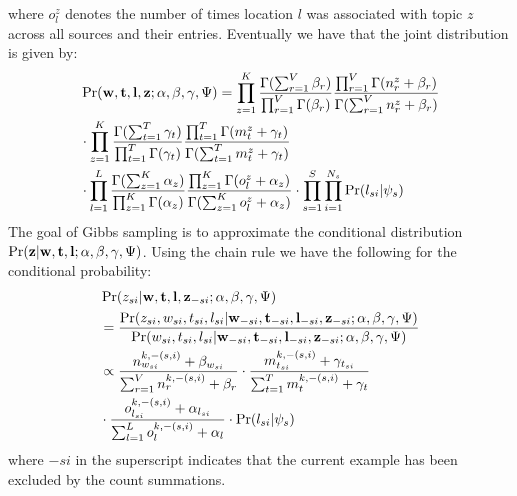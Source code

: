 \documentclass{sig-alternate}
\newcommand{\w}{{\bf w}}
\newcommand{\z}{{\bf z}}
\newcommand{\loc}{{\bf l}}
\newcommand{\tim}{{\bf t}}
\begin{document}
where $o^z_l$ denotes the number of times location $l$ was associated with topic $z$ across all sources and their entries. 
Eventually we have that the joint distribution is given by:
{\scriptsize
\begin{align}
&\Pr(\w,\tim,\loc,\z;\alpha,\beta,\gamma,\Psi) = \prod_{z = 1}^K \frac{\Gamma(\sum_{r = 1}^V \beta_r)}{\prod_{r = 1}^V \Gamma(\beta_r)} \frac{\prod_{r = 1}^V \Gamma(n^{z}_{r} + \beta_r)}{\Gamma(\sum_{r =1}^V n^{z}_{r} + \beta_r)} \nonumber \\
&\cdot \prod_{z = 1}^K \frac{\Gamma(\sum_{t = 1}^T \gamma_t)}{\prod_{t = 1}^T \Gamma(\gamma_t)} \frac{\prod_{t = 1}^T \Gamma(m^{z}_{t} + \gamma_t)}{\Gamma(\sum_{t =1}^T m^{z}_{t} + \gamma_t)} \nonumber \\
& \cdot \prod_{l =1}^L\frac{\Gamma(\sum_{z = 1}^K \alpha_z)}{\prod_{z = 1}^K \Gamma(\alpha_z)}\frac{\prod_{z=1}^K\Gamma(o^z_l + \alpha_z)}{\Gamma(\sum_{z = 1}^K o^z_l + \alpha_z)} \cdot \prod_{s = 1}^{S}\prod_{i = 1}^{N_s} \Pr(l_{si}|\psi_s) \nonumber
\end{align}}
The goal of Gibbs sampling is to approximate the conditional distribution $\Pr(\z | \w, \tim,\loc;\alpha,\beta,\gamma,\Psi)$. Using the chain rule we have the following for the conditional probability:
{\scriptsize
\begin{align}
&\Pr(z_{si}| \w,\tim,\loc,\z_{-si};\alpha,\beta,\gamma,\Psi) \nonumber \\
&= \frac{\Pr(z_{si}, w_{si}, t_{si}, l_{si}|\w_{-si},\tim_{-si},\loc_{-si},\z_{-si};\alpha,\beta,\gamma,\Psi)}{\Pr(w_{si}, t_{si}, l_{si}|\w_{-si},\tim_{-si},\loc_{-si},\z_{-si};\alpha,\beta,\gamma,\Psi)} \nonumber \\
& \propto \frac{n^{k,-(s,i)}_{w_{si}} + \beta_{w_{si}}}{\sum_{r = 1}^V n^{k,-(s,i)}_{r} + \beta_{r}} \cdot \frac{m^{k,-(s,i)}_{t_{si}} + \gamma_{t_{si}}}{\sum_{t = 1}^T m^{k,-(s,i)}_{t} + \gamma_{t}} \nonumber \\
& \cdot \frac{o^{k,-(s,i)}_{l_{si}} + \alpha_{l_{si}}}{\sum_{l = 1}^L o^{k,-(s,i)}_{l} + \alpha_{l}} \cdot \Pr(l_{si}|\psi_s) \nonumber
\end{align}}
where $-si$ in the superscript indicates that the current example has been excluded by the count summations. 
\end{document}
